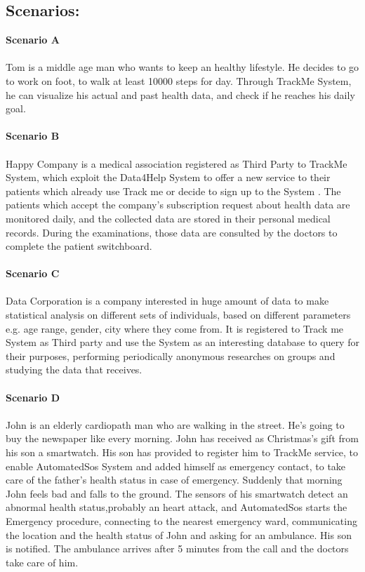 \subsection{Scenarios:}
\textbf{Scenario A} \\ \\
Tom is a middle age man who wants to keep an healthy lifestyle. He  decides to go to work on foot, to walk at least 10000 steps for day. Through TrackMe System, he can visualize his actual and past health data, and check if he reaches his daily goal. \\ \\
\textbf{Scenario B} \\ \\
Happy Company is a medical association registered as Third Party to TrackMe System, which exploit the Data4Help System to offer a new service to their patients which already use Track me or decide to sign up to the System . The patients which accept the company's subscription request about health data are monitored daily, and the collected data are stored in their personal medical records. During the examinations, those data are consulted by the doctors to complete the patient switchboard. \\ \\
\textbf{Scenario C} \\ \\
Data Corporation is a company interested in huge amount of data to make statistical analysis on different sets of individuals, based on different parameters e.g. age range, gender, city where they come from. It is registered to Track me System as Third party and use the System as an interesting database to query for their purposes, performing periodically anonymous researches on groups and studying the data that receives. \\ \\
\textbf{Scenario D} \\ \\
John is an elderly cardiopath man who are walking in the street. He's going to buy the newspaper like every morning. 
John has received as Christmas's gift from his son a smartwatch. His son has provided to register him to TrackMe service, to enable AutomatedSos System and added himself as emergency contact, to  take care of the father's health status in case of emergency.
Suddenly that morning John feels bad and falls to the ground. The sensors of his smartwatch detect an abnormal health status,probably an heart attack, and AutomatedSos starts the Emergency procedure, connecting to the nearest emergency ward, communicating the location and the health status of John and asking for an ambulance. His son is notified. The ambulance arrives after 5 minutes from the call and the doctors take care of him. \\ \\
